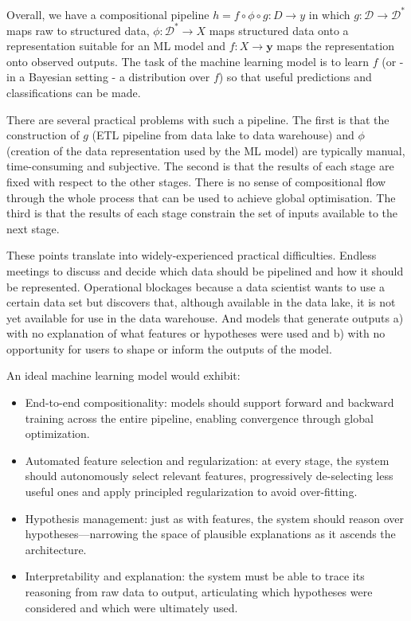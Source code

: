 \documentclass[11pt]{article}
\begin{document}
	Overall, we have a compositional pipeline $h = f \circ \phi \circ g : D \rightarrow y$ in which $g: \mathcal{D} \rightarrow \mathcal{D}^{*}$ maps raw to structured data, $\phi: \mathcal{D}^{*} \rightarrow X$ maps structured data onto a representation suitable for an ML model and $f: X \rightarrow \boldsymbol{y}$ maps the representation onto observed outputs. The task of the machine learning model is to learn $f$ (or - in a Bayesian setting - a distribution over $f$) so that useful predictions and classifications can be made.
	
	There are several practical problems with such a pipeline. The first is that the construction of $g$ (ETL pipeline from data lake to data warehouse) and $\phi$ (creation of the data representation used by the ML model) are typically manual, time-consuming and subjective. The second is that the results of each stage are fixed with respect to the other stages. There is no sense of compositional flow through the whole process that can be used to achieve global optimisation. The third is that the results of each stage constrain the set of inputs available to the next stage.
	
	These points translate into widely-experienced practical difficulties. Endless meetings to discuss and decide which data should be pipelined and how it should be represented. Operational blockages because a data scientist wants to use a certain data set but discovers that, although available in the data lake, it is not yet available for use in the data warehouse. And models that generate outputs a) with no explanation of what features or hypotheses were used and b) with no opportunity for users to shape or inform the outputs of the model.
	
	An ideal machine learning model would exhibit:
	
	\begin{itemize}
		
	\item End-to-end compositionality: models should support forward and backward training across the entire pipeline, enabling convergence through global optimization.
	\item Automated feature selection and regularization: at every stage, the system should autonomously select relevant features, progressively de-selecting less useful ones and apply principled regularization to avoid over-fitting.
	\item Hypothesis management: just as with features, the system should reason over hypotheses—narrowing the space of plausible explanations as it ascends the architecture.
	\item Interpretability and explanation: the system must be able to trace its reasoning from raw data to output, articulating which hypotheses were considered and which were ultimately used.
	
	\end{itemize}
	
\end{document}
